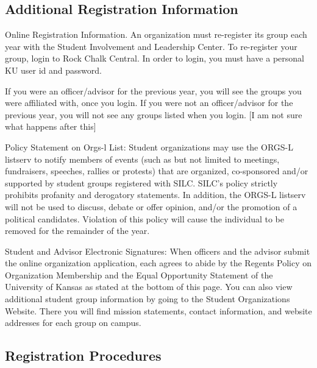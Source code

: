 \subsection{Additional Registration Information}

Online Registration Information. An organization must re-register its group each year with the Student Involvement and Leadership Center. To re-register your group, login to Rock Chalk Central. In order to login, you must have a personal KU user id and password.

If you were an officer/advisor for the previous year, you will see the groups you were affiliated with, once you login.
If you were not an officer/advisor for the previous year, you will not see any groups listed when you login. [I am not sure what happens after this]

Policy Statement on Orgs-l List:  Student organizations may use the ORGS-L listserv to notify members of events (such as but not limited to meetings, fundraisers, speeches, rallies or protests) that are organized, co-sponsored and/or supported by student groups registered with SILC.  SILC's policy strictly prohibits profanity and derogatory statements.  In addition, the ORGS-L listserv will not be used to discuss, debate or offer opinion, and/or the promotion of a political candidates. Violation of this policy will cause the individual to be removed for the remainder of the year.

Student and Advisor Electronic Signatures: When officers and the advisor submit the online organization application, each agrees to abide by the Regents Policy on Organization Membership and the Equal Opportunity Statement of the University of Kansas as stated at the bottom of this page. You can also view additional student group information by going to the Student Organizations Website. There you will find mission statements, contact information, and website addresses for each group on campus.

\subsection{Registration Procedures}

